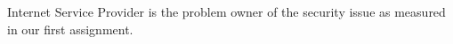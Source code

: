 Internet Service Provider is the problem owner of the security issue as measured in our first assignment. 
